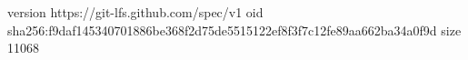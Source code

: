 version https://git-lfs.github.com/spec/v1
oid sha256:f9daf145340701886be368f2d75de5515122ef8f3f7c12fe89aa662ba34a0f9d
size 11068

